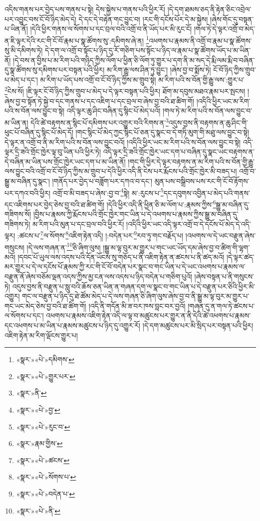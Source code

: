 འདིས་གནས་པར་བྱེད་པས་གནས་པ་སྟེ། དེས་སྐྱེས་པ་གནས་པའི་ཕྱིར་རོ། །དེ་དག་ཐམས་ཅད་ནི་རྟེན་ཅིང་འབྲེལ་པར་འབྱུང་བས་ངོ་བོ་ཉིད་མེད་དེ། དེ་དང་དེ་བརྟེན་གང་བྱུང་བ། །རང་གི་དངོས་པོར་དེ་མ་སྐྱེས། །ཞེས་གོང་དུ་བསྟན་པ་ཡིན་ནོ། །དེའི་ཕྱིར་གནས་ལ་སོགས་པ་དང་བྲལ་བའི་འགྲོ་བ་ནི་ཡོད་པར་མི་རུང་ངོ། །གལ་ཏེ་དེ་ལྟར་འགྲོ་བ་མེད་ན་ཇི་ལྟར་དེའི་རང་གི་ངོ་བོ་རྣམ་པ་སྣ་ཚོགས་སུ་:དམིགས་ཞེ་ན། \footnote{«སྣར་»«པེ་»དམིགས་}འཕགས་པ་རྣམས་ནི་འགྲོ་བ་རྣམ་པ་སྣ་ཚོགས་སུ་མི་དམིགས་ཏེ། དེ་དག་ལ་འགྲོ་བ་སྟོང་པ་ཉིད་དུ་རོ་གཅིག་པས་སྟོང་པ་ཉིད་ལ་རྣམ་པ་སྣ་ཚོགས་ཡོད་པ་མ་ཡིན་ནོ། །དེ་བས་ན་བྱིས་པ་མ་རིག་པའི་གཉིད་ཀྱིས་ལོག་པ་ཕྱིན་ཅི་ལོག་ཏུ་གྱུར་པ་དག་ནི་མ་སད་དེ་རྨི་ལམ་རྨི་བ་བཞིན་དུ་སྣ་ཚོགས་སུ་དམིགས་པར་བསྟན་པའི་ཕྱིར། མ་རིག་རྒྱུ་ལས་ཤིན་ཏུ་བྱུང་། །ཞེས་བྱ་བ་སྨོས་ཏེ། ངོ་བོ་ཉིད་ཀྱིས་གྲུབ་པ་མེད་པ་དང་། མ་རིག་པ་ཡོད་པས་འགྲོ་བ་ངོ་བོ་ཉིད་ཀྱིས་མ་གྲུབ་སྟེ། མ་རིག་པའི་ས་བོན་གྱི་རྒྱུ་ལས་:གྱུར་པ་\footnote{«སྣར་»«པེ་»གྱུར་པར་}ངེས་སོ། །ཇི་ལྟར་ངོ་བོ་ཉིད་ཀྱིས་གྲུབ་པ་མེད་པ་དེ་ལྟར་བསྟན་པའི་ཕྱིར། ཐོག་མ་དབུས་མཐའ་རྣམ་པར་སྤངས། །ཞེས་བྱ་བ་སྟོན་ཏེ་སྐྱེ་བ་དང་གནས་པ་དང་འཇིག་པ་དང་བྲལ་བ་ཞེས་བྱ་བའི་ཐ་ཚིག་གོ། །འདིའི་ཕྱིར་ཡང་མ་རིག་པའི་ས་བོན་ལས་བྱུང་བ་སྟེ། འདི་ལྟར་ཆུ་ཤིང་བཞིན་དུ་སྙིང་པོ་མེད་པའོ། །གལ་ཏེ་མ་རིག་པའི་ས་བོན་ལས་བྱུང་བ་མ་ཡིན་ན། དེའི་ཚེ་བརྟགས་ན་སྙིང་པོ་དམིགས་པར་འགྱུར་བའི་རིགས་ན་\footnote{«སྣར་»ནི་}འདུས་བྱས་ནི་བརྟགས་ན་ཆུ་ཤིང་གི་ཕུང་པོ་བཞིན་དུ་སྙིང་པོ་མེད་དོ། །གང་སྙིང་པོ་མེད་ཀྱང་སྙིང་པོ་ཅན་དུ་སྣང་བ་དེ་གཏི་མུག་གི་མཐུ་ལས་བྱུང་བ་སྟེ། དེ་ལྟར་ན་འགྲོ་བ་ནི་མ་རིག་པའི་ས་བོན་ལས་བྱུང་བའོ། །འདིའི་ཕྱིར་ཡང་མ་རིག་པའི་ས་བོན་ལས་བྱུང་བ་སྟེ། འདི་ལྟར་དྲི་ཟའི་གྲོང་ཁྱེར་ལྟ་བུ་ཡིན་པའི་ཕྱིར་ཏེ། འདི་ལྟར་དྲི་ཟའི་གྲོང་ཁྱེར་ཡང་དག་པ་བཞིན་དུ་སྣང་ཡང་བརྟགས་ན་དེ་བཞིན་མ་ཡིན་པས་གྲོང་ཁྱེར་ཡང་དག་པ་མ་ཡིན་ནོ། །གང་གི་ཕྱིར་དེ་ལྟར་བརྟགས་ན་མ་རིག་པའི་ས་བོན་གྱི་རྒྱུ་ལས་བྱུང་བའི་འགྲོ་བ་ངོ་བོ་ཉིད་ཀྱིས་མ་གྲུབ་པ་དེའི་ཕྱིར་འདི་ནི་ངེས་པར་རྨོངས་པའི་གྲོང་ཁྱེར་མི་བཟད་པ། འགྲོ་བ་སྒྱུ་མ་བཞིན་དུ་སྣང་། །གནོད་པར་བྱེད་པ་བཟློག་པར་དཀའ་བ་དང་། མུན་པས་བསྒྲིབས་པས་རང་གི་ངོ་བོ་རྟོགས་པར་དཀའ་བའི་ཕྱིར། འགྲོ་བ་མི་བཟད་པ་ཞེས་:བྱ་བ་\footnote{«སྣར་»«པེ་»བྱ་}སྟེ། མ་:རུངས་པ་\footnote{«སྣར་»«པེ་»རུང་བ་}དང་དབུགས་འབྱིན་པ་མེད་པའི་གནས་དང་འཇིགས་པར་བྱེད་ཅེས་བྱ་བའི་ཐ་ཚིག་གོ། །དེའི་ཕྱིར་འདི་ནི་ཕྱིན་ཅི་མ་ལོག་པ་:རྣམས་ཀྱིས་\footnote{«སྣར་»རྣམ་གྱིས་}སྒྱུ་མ་བཞིན་དུ་གཟིགས་སོ། །བྱིས་པ་རྣམས་ཀྱི་རྨོངས་པའི་གྲོང་ཁྱེར་གང་ཡིན་པ་དེ་འཕགས་པ་རྣམས་ཀྱིས་སྒྱུ་མ་བཞིན་དུ་གཟིགས་ཏེ། མ་རིག་པའི་མུན་པ་དང་བྲལ་བའི་ཕྱིར་རོ། །འདིའི་ཕྱིར་ཡང་འདི་ལྟར་འགྲོ་བ་དེ་དངོས་པོ་མེད་དེ་འདི་ལྟར། :ཚངས་པ་\footnote{«སྣར་»«པེ་»ཚངས་}ལ་སོགས་\footnote{«སྣར་»«པེ་»སོགས་པ་}འཇིག་རྟེན་འདི། །:བདེན་པར་\footnote{«སྣར་»«པེ་»བདེན་པ་}རབ་ཏུ་གང་བརྗོད་པ། །འཕགས་ལ་དེ་ཡང་བརྫུན་ཞེས་གསུངས། །དེ་ལས་གཞན་ན་\footnote{«སྣར་»«པེ་»ནི་}ཅི་ཞིག་ལུས། །སྒྱུ་མ་ལྟ་བུར་མ་གྱུར་པ་གང་ཡང་ཡོད་དམ་ཞེས་བྱ་བ་ཚིག་གི་ལྷག་མའོ། །དབང་པོ་ཡུལ་ལས་འདས་པའི་དོན་ཡོངས་སུ་གཅོད་པ་ནི་འཇིག་རྟེན་ན་ཚངས་པ་ནི་ཚད་མའོ། །དེ་ལྟར་ཚད་མར་གྱུར་པ་དེ་ལ་དངོས་པོ་རྣམས་ཀྱི་རང་གི་ངོ་བོ་བདེན་པར་སྣང་བ་གང་ཡིན་པ་དེ་ཡང་འཕགས་པ་རྣམས་ལ་བརྫུན་ནོ་ཞེས་བཅོམ་ལྡན་འདས་ཀྱིས་མྱ་ངན་ལས་འདས་པ་ཉིད་བདེན་པ་གཅིག་པུའོ། །ཞེས་བསྟན་པ་ནི་གསུངས་ཏེ། འདུས་བྱས་ནི་བརྫུན་པ་སླུ་བའི་ཆོས་ཅན་ཡིན་ན་གཞན་དག་ལ་སྣང་བ་གང་ཡིན་པ་དེ་བརྫུན་པར་ཅིའི་ཕྱིར་མི་འགྱུར། གང་ལ་བརྫུན་པ་ཉིད་དུ་ཐེ་ཚོམ་མེད་པ་དེ་ལས་གཞན་ཅི་ཞིག་ལུས་ཞེས་བྱ་བ་ནི་སྒྱུ་མ་ལྟ་བུར་མ་གྱུར་པ་གང་ཡང་མེད་ཅེས་བྱ་བའི་ཐ་ཚིག་གོ། །འདི་ནི་གདོན་མི་ཟ་བར་ཁས་བླང་བར་བྱའོ། །གཞན་དུ་ན་གལ་ཏེ་ཚངས་པ་ལ་སོགས་པ་དང་། འཕགས་པ་རྣམས་འཇིག་རྟེན་འདི་ལ་ལྟ་བ་མཚུངས་པར་གྱུར་ན་ནི་དེའི་ཚེ་འཕགས་པ་རྣམས་དང་འཕགས་པ་མ་ཡིན་པ་རྣམས་མཚུངས་པ་ཉིད་དུ་འགྱུར་རོ། །དེ་དག་མཚུངས་པར་མི་སྲིད་པར་བསྟན་པའི་ཕྱིར། འཇིག་རྟེན་མ་རིག་ལྡོངས་གྱུར་པ། 